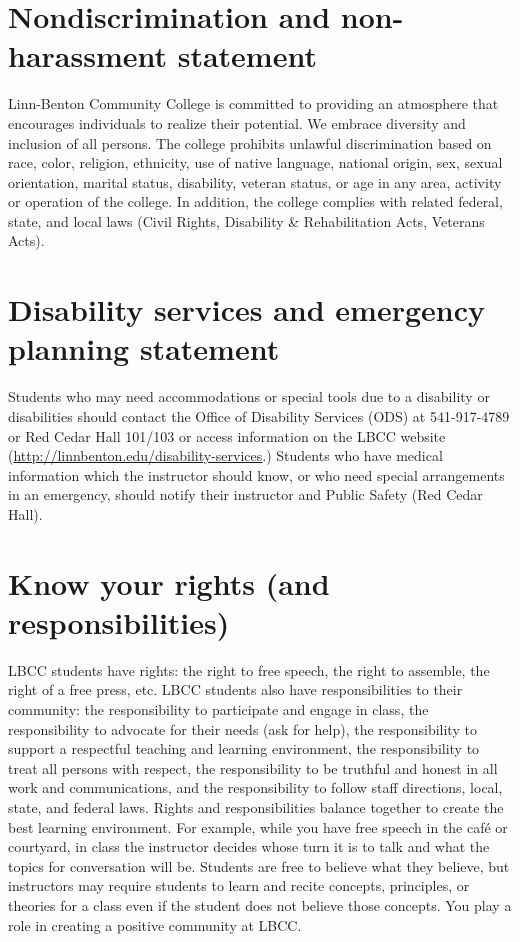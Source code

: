\documentclass[12pt,article,oneside]{memoir}
\begin{document}
\section{Nondiscrimination and non-harassment statement}

Linn-Benton Community College is committed to providing an atmosphere that  encourages individuals to realize their potential. We embrace diversity and inclusion of all persons. The college prohibits unlawful discrimination based on race, color, religion, ethnicity, use of native language, national origin, sex, sexual orientation, marital status, disability, veteran status, or age in any area, activity or operation of the college. In addition, the college complies with related federal, state, and local laws (Civil Rights, Disability \& Rehabilitation Acts, Veterans Acts).

\section{Disability services and emergency planning statement}

Students who may need accommodations or special tools due to a disability or disabilities should contact the Office of Disability Services (ODS) at 541-917-4789 or Red Cedar Hall 101/103 or access information on the LBCC website (\url{http://linnbenton.edu/disability-services}.) Students who have medical information which the instructor should know, or who need special arrangements in an emergency, should notify their instructor and Public Safety (Red Cedar Hall).

\section{Know your rights (and responsibilities)}

LBCC students have rights: the right to free speech, the right to assemble, the right of a free press, etc. LBCC students also have responsibilities to their community: the responsibility to participate and engage in class, the responsibility to advocate for their needs (ask for help), the responsibility to support a respectful teaching and learning environment, the responsibility to treat all persons with respect, the responsibility to be truthful and honest in all work and communications, and the responsibility to follow staff directions, local, state, and federal laws. Rights and responsibilities balance together to create the best learning environment. For example, while you have free speech in the caf\'{e} or courtyard, in class the instructor decides whose turn it is to talk and what the topics for conversation will be. Students are free to believe what they believe, but instructors may require students to learn and recite concepts, principles, or theories for a class even if the student does not believe those concepts. You play a role in creating a positive community at LBCC. 
\end{document}
